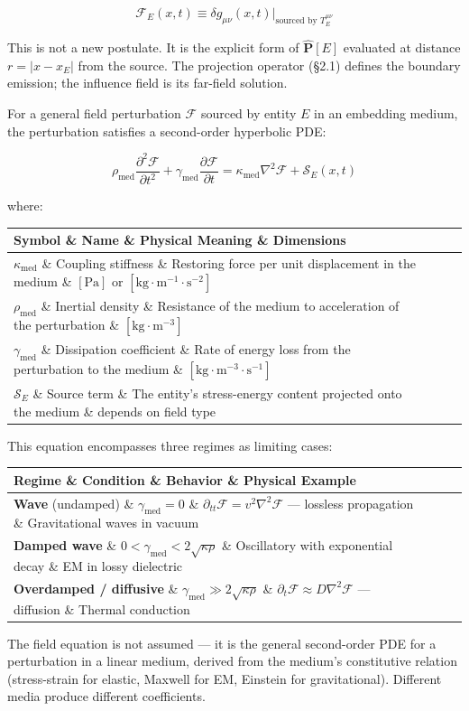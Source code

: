 \documentclass[11pt,a4paper]{article}
\theoremstyle{definition}\newtheorem{definition}{Definition}
\theoremstyle{remark}\newtheorem{remark}{Remark}
\begin{document}
\begin{equation}
\mathcal{F}_E(x, t) \equiv \delta g_{\mu\nu}(x, t) \Big|_{\text{sourced by } T^{\mu\nu}_E}
\end{equation}


This is not a new postulate. It is the explicit form of $\hat{\mathbf{P}}[E]$ evaluated at distance $r = |x - x_E|$ from the source. The projection operator (§2.1) defines the boundary emission; the influence field is its far-field solution.

For a general field perturbation $\mathcal{F}$ sourced by entity $E$ in an embedding medium, the perturbation satisfies a second-order hyperbolic PDE:


\begin{equation}
\boxed{\rho_{\text{med}} \frac{\partial^2 \mathcal{F}}{\partial t^2} + \gamma_{\text{med}} \frac{\partial \mathcal{F}}{\partial t} = \kappa_{\text{med}} \nabla^2 \mathcal{F} + \mathcal{S}_E(x, t)}
\end{equation}


where:

\begin{longtable}{llll}
\hline
Symbol \& Name \& Physical Meaning \& Dimensions \\
\hline
$\kappa_{\text{med}}$ \& Coupling stiffness \& Restoring force per unit displacement in the medium \& $[\text{Pa}]$ or $[\text{kg} \cdot \text{m}^{-1} \cdot \text{s}^{-2}]$ \\
$\rho_{\text{med}}$ \& Inertial density \& Resistance of the medium to acceleration of the perturbation \& $[\text{kg} \cdot \text{m}^{-3}]$ \\
$\gamma_{\text{med}}$ \& Dissipation coefficient \& Rate of energy loss from the perturbation to the medium \& $[\text{kg} \cdot \text{m}^{-3} \cdot \text{s}^{-1}]$ \\
$\mathcal{S}_E$ \& Source term \& The entity's stress-energy content projected onto the medium \& depends on field type \\
\hline
\end{longtable}
This equation encompasses three regimes as limiting cases:

\begin{longtable}{llll}
\hline
Regime \& Condition \& Behavior \& Physical Example \\
\hline
\textbf{Wave} (undamped) \& $\gamma_{\text{med}} = 0$ \& $\partial_{tt}\mathcal{F} = v^2 \nabla^2 \mathcal{F}$ — lossless propagation \& Gravitational waves in vacuum \\
\textbf{Damped wave} \& $0 < \gamma_{\text{med}} < 2\sqrt{\kappa \rho}$ \& Oscillatory with exponential decay \& EM in lossy dielectric \\
\textbf{Overdamped / diffusive} \& $\gamma_{\text{med}} \gg 2\sqrt{\kappa \rho}$ \& $\partial_t \mathcal{F} \approx D \nabla^2 \mathcal{F}$ — diffusion \& Thermal conduction \\
\hline
\end{longtable}
The field equation is not assumed — it is the general second-order PDE for a perturbation in a linear medium, derived from the medium's constitutive relation (stress-strain for elastic, Maxwell for EM, Einstein for gravitational). Different media produce different coefficients.
\end{document}
